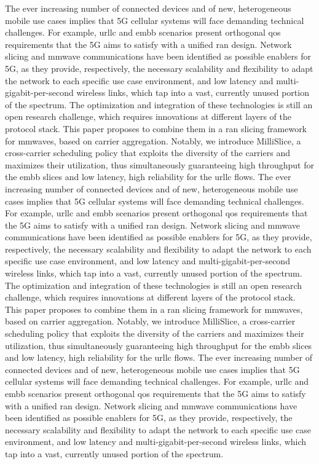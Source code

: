\documentclass[a4paper, 11pt, oneside]{article}
\begin{document}
  The ever increasing number of connected devices and of new, heterogeneous mobile use cases implies that 5G cellular systems will face demanding technical challenges. For example, \gls{urllc} and \gls{embb} scenarios present orthogonal \gls{qos} requirements that the 5G aims to satisfy with a unified \gls{ran} design. Network slicing and \gls{mmwave} communications have been identified as possible enablers for 5G, as they provide, respectively, the necessary scalability and flexibility to adapt the network to each specific use case environment, and low latency and multi-gigabit-per-second wireless links, which tap into a vast, currently unused portion of the spectrum.
  The optimization and integration of these technologies is still an open research challenge, which requires innovations at different layers of the protocol stack. This paper proposes to combine them in a \gls{ran} slicing framework for \glspl{mmwave}, based on carrier aggregation. Notably, we introduce MilliSlice, a cross-carrier scheduling policy that exploits the diversity of the carriers and maximizes their utilization, thus simultaneously guaranteeing high throughput for the \gls{embb} slices and low latency, high reliability for the \gls{urllc} flows.
    The ever increasing number of connected devices and of new, heterogeneous mobile use cases implies that 5G cellular systems will face demanding technical challenges. For example, \gls{urllc} and \gls{embb} scenarios present orthogonal \gls{qos} requirements that the 5G aims to satisfy with a unified \gls{ran} design. Network slicing and \gls{mmwave} communications have been identified as possible enablers for 5G, as they provide, respectively, the necessary scalability and flexibility to adapt the network to each specific use case environment, and low latency and multi-gigabit-per-second wireless links, which tap into a vast, currently unused portion of the spectrum.
  The optimization and integration of these technologies is still an open research challenge, which requires innovations at different layers of the protocol stack. This paper proposes to combine them in a \gls{ran} slicing framework for \glspl{mmwave}, based on carrier aggregation. Notably, we introduce MilliSlice, a cross-carrier scheduling policy that exploits the diversity of the carriers and maximizes their utilization, thus simultaneously guaranteeing high throughput for the \gls{embb} slices and low latency, high reliability for the \gls{urllc} flows.
    The ever increasing number of connected devices and of new, heterogeneous mobile use cases implies that 5G cellular systems will face demanding technical challenges. For example, \gls{urllc} and \gls{embb} scenarios present orthogonal \gls{qos} requirements that the 5G aims to satisfy with a unified \gls{ran} design. Network slicing and \gls{mmwave} communications have been identified as possible enablers for 5G, as they provide, respectively, the necessary scalability and flexibility to adapt the network to each specific use case environment, and low latency and multi-gigabit-per-second wireless links, which tap into a vast, currently unused portion of the spectrum.
\end{document}
